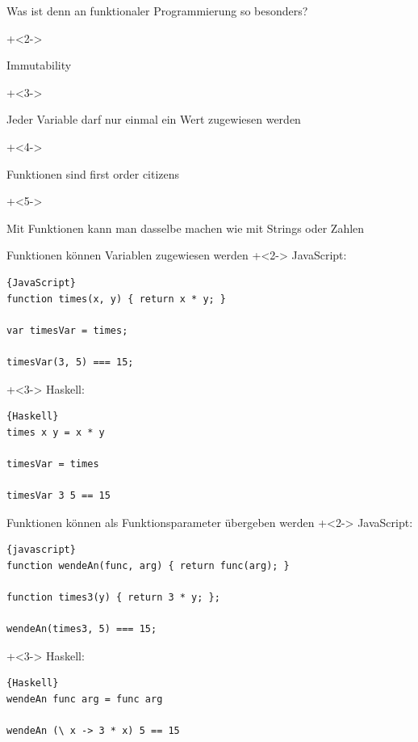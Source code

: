 \begin{frame}[fragile]{Was ist denn an funktionaler Programmierung so besonders?}

\onslide+<2->
\begin{center}
\Large
Immutability
\end{center}

\onslide+<3->
\begin{center}
Jeder Variable darf nur einmal ein Wert zugewiesen werden
\end{center}

\vspace{1em}

\onslide+<4->
\begin{center}
\Large
Funktionen sind \glqq{}first order citizens\grqq{}
\end{center}

\onslide+<5->
\begin{center}
Mit Funktionen kann man dasselbe machen wie mit Strings oder Zahlen
\end{center}

\end{frame}

\begin{frame}[fragile]{Funktionen können Variablen zugewiesen werden}
\onslide+<2->
JavaScript:
\begin{lstlisting}{JavaScript}
function times(x, y) { return x * y; }

var timesVar = times;
    
timesVar(3, 5) === 15;
\end{lstlisting}

\onslide+<3->
Haskell:
\begin{lstlisting}{Haskell}
times x y = x * y

timesVar = times

timesVar 3 5 == 15
\end{lstlisting}

\end{frame}

\begin{frame}[fragile]{Funktionen können als Funktionsparameter übergeben werden}
\onslide+<2->
JavaScript:
\begin{lstlisting}{javascript}
function wendeAn(func, arg) { return func(arg); }

function times3(y) { return 3 * y; };

wendeAn(times3, 5) === 15;
\end{lstlisting}

\onslide+<3->
Haskell:
\begin{lstlisting}{Haskell}
wendeAn func arg = func arg

wendeAn (\ x -> 3 * x) 5 == 15
\end{lstlisting}

\end{frame}

